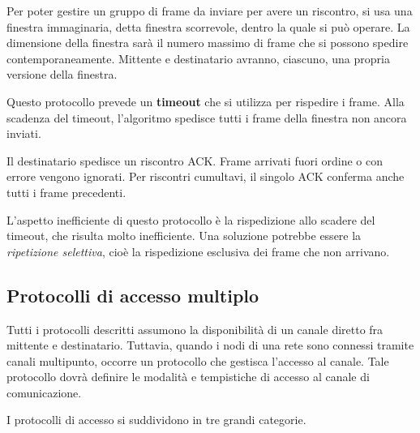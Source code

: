             Per poter gestire un gruppo di frame da inviare per avere un riscontro, si usa una finestra immaginaria, detta finestra scorrevole, dentro la quale si può operare. La dimensione della finestra sarà il numero massimo di frame che si possono spedire contemporaneamente. Mittente e destinatario avranno, ciascuno, una propria versione della finestra.
            
            Questo protocollo prevede un \textbf{timeout} che si utilizza per rispedire i frame. Alla scadenza del timeout, l'algoritmo spedisce tutti i frame della finestra non ancora inviati. 
            
            Il destinatario spedisce un riscontro ACK. Frame arrivati fuori ordine o con errore vengono ignorati. Per riscontri cumultavi, il singolo ACK conferma anche tutti i frame precedenti.
            
            L'aspetto inefficiente di questo protocollo è la rispedizione allo scadere del timeout, che risulta molto inefficiente. Una soluzione potrebbe essere la \textit{ripetizione selettiva}, cioè la rispedizione esclusiva dei frame che non arrivano.
            
    \subsection{Protocolli di accesso multiplo}
        
        Tutti i protocolli descritti assumono la disponibilità di un canale diretto fra mittente e destinatario. Tuttavia, quando i nodi di una rete sono connessi tramite canali multipunto, occorre un protocollo che gestisca l'accesso al canale. Tale protocollo dovrà definire le modalità e tempistiche di accesso al canale di comunicazione.
            
        I protocolli di accesso si suddividono in tre grandi categorie.
            
